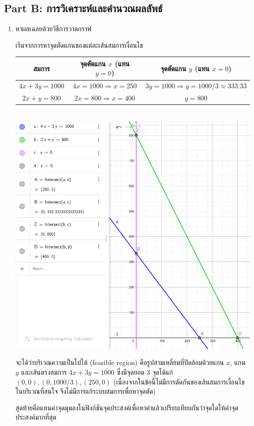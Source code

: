 \subsection*{Part B: การวิเคราะห์และคำนวณผลลัพธ์}
\begin{enumerate}
    \item หาผลเฉลยด้วยวิธีการวาดกราฟ
    \begin{solution}
        เริ่มจากการหาจุดตัดแกนของแต่ละเส้นสมการเงื่อนไข
        \begin{center}
            \begin{tabular}{|c|c|c|}
                \hline
                    สมการ & จุดตัดแกน $x$ (แทน $y=0$)  & จุดตัดแกน $y$ (แทน $x=0$) \\
                    \hline
                    $4x + 3y= 1000$ & $4x = 1000 \Rightarrow x = 250$ & $3y = 1000 \Rightarrow y = 1000/3 \approx 333.33$ \\
                    \hline
                    $2x + y = 800$ & $2x = 800 \Rightarrow x = 400$ & $y = 800$\\
                    \hline
            \end{tabular}\\
    
            
            \includegraphics[width=0.6\linewidth]{assChap1-B-1.png}
        \end{center}
        จะได้ว่าบริเวณความเป็นไปได้ (feasible region) คือรูปสามเหลี่ยมที่ปิดล้อมด้วยแกน $x$, แกน $y$ และเส้นตรงสมการ $4x+3y=1000$ ซึ่งมีจุดยอด 3 จุดได้แก่ $(0,0), (0,1000/3), (250,0)$ (เนื่องจากในข้อนี้ไม่มีการตัดกันของเส้นสมการเงื่อนไขในบริเวณที่สนใจ จึงไม่มีการแก้ระบบสมการเพื่อหาจุดตัด)
    
        สุดท้ายคือแทนค่าจุดมุมลงในฟังก์ชันจุดประสงค์เพื่อหาค่าแล้วเปรียบเทียบกันว่าจุดใดให้ค่าจุดประสงค์มากที่สุด
    

\end{solution}
\end{enumerate}

